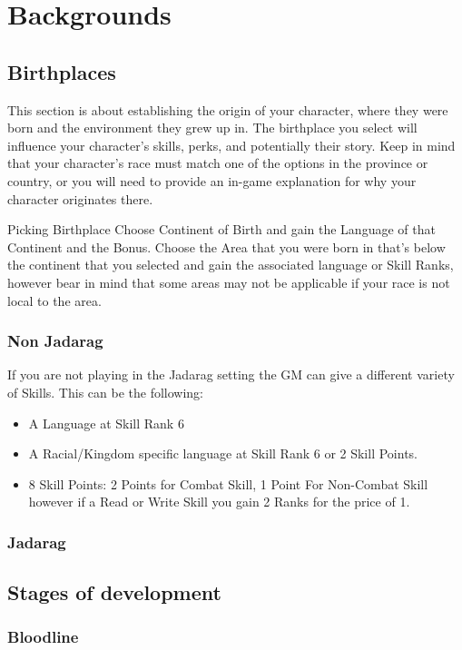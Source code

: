 \documentclass[12pt]{article}
\begin{document}
\section{Backgrounds}
\subsection{Birthplaces}
This section is about establishing the origin of your character, where they were born and the environment they grew up in. The birthplace you select will influence your character's skills, perks, and potentially their story. Keep in mind that your character's race must match one of the options in the province or country, or you will need to provide an in-game explanation for why your character originates there.

Picking Birthplace
Choose Continent of Birth and gain the Language of that Continent and the Bonus.
Choose the Area that you were born in that's below the continent that you selected and gain the associated language or Skill Ranks, however bear in mind that some areas may not be applicable if your race is not local to the area.

\subsubsection{Non Jadarag}
If you are not playing in the Jadarag setting the GM can give a different variety of Skills. This can be the following:
\begin{itemize}
\item A Language at Skill Rank 6
\item A Racial/Kingdom specific language at Skill Rank 6 or 2 Skill Points.
\item 8 Skill Points: 2 Points for Combat Skill, 1 Point For Non-Combat Skill however if a Read or Write Skill you gain 2 Ranks for the price of 1.
\end{itemize}
\subsubsection{Jadarag}
	\newpage
	  \newpage
\subsection{Stages of development}
\subsubsection{Bloodline}
\end{document}
